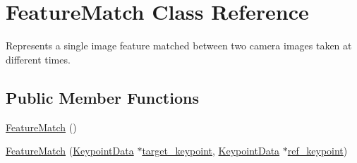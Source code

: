 \hypertarget{classfovis_1_1FeatureMatch}{
\section{FeatureMatch Class Reference}
\label{classfovis_1_1FeatureMatch}
}


Represents a single image feature matched between two camera images taken at different times.  


\subsection*{Public Member Functions}
\begin{DoxyCompactItemize}
\item 
\hyperlink{classfovis_1_1FeatureMatch_adccc0fc6e6b8100d71bd31cfcb9ae745}{FeatureMatch} ()
\item 
\hyperlink{classfovis_1_1FeatureMatch_a3c2499c4698d2dc6ae72224524aa693a}{FeatureMatch} (\hyperlink{classfovis_1_1KeypointData}{KeypointData} $\ast$\hyperlink{classfovis_1_1FeatureMatch_a85a2bf617b8f5152083f5acda254a61c}{target\_\-keypoint}, \hyperlink{classfovis_1_1KeypointData}{KeypointData} $\ast$\hyperlink{classfovis_1_1FeatureMatch_a63211a4e001cec95acf8363b81af1216}{ref\_\-keypoint})
\end{DoxyCompactItemize}
